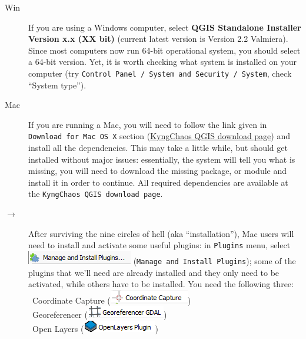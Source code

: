\documentclass[12pt,oneside]{article}
\begin{document}
\begin{description}
\item[Win]If you are using a Windows computer, select \textbf{QGIS Standalone Installer Version x.x (XX bit)} (current latest version is Version 2.2 Valmiera). Since most computers now run 64-bit operational system, you should select a 64-bit version. Yet, it is worth checking what system is installed on your computer (try \texttt{Control Panel~/ System and Security~/ System}, check ``System type'').

\item[Mac]If you are running a Mac, you will need to follow the link given in \texttt{Download for Mac OS X} section (\href{http://www.kyngchaos.com/software/qgis}{KyngChaos QGIS download page}) and install all the dependencies. This may take a little while, but \QGIS should get installed without major issues: essentially, the system will tell you what is missing, you will need to download the missing package, or module and install it in order to continue. All required dependencies are available at the \texttt{KyngChaos QGIS download page}.

\item[$\rightarrow$] After surviving the nine circles of hell (aka ``installation''), Mac users will need to install and activate some useful plugins: in \texttt{Plugins} menu, select \includegraphics[scale=.75]{qgis_plugins} (\texttt{Manage and Install Plugins}); some of the plugins that we'll need are already installed and they only need to be activated, while others have to be installed. You need the following three:\\
\textbullet~Coordinate Capture (\includegraphics[scale=.5]{qgis_capture})\\
\textbullet~Georeferencer (\includegraphics[scale=.5]{qgis_georeferencer})\\
\textbullet~Open Layers (\includegraphics[scale=.5]{qgis_openlayers})\\


\end{description}
\end{document}
